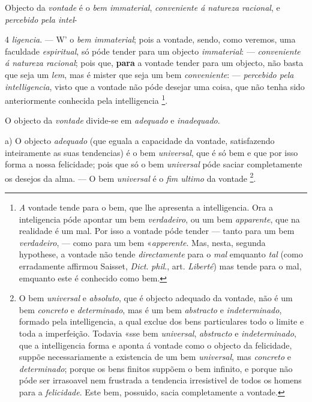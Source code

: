 
Objecto da \emph{vontade} é o \emph{bem immaterial}, \emph{conveniente á natureza racional}, e \emph{percebido pela intel}-

4 \emph{ligencia}. --- W' o \emph{bem immaterial}; pois a vontade, sendo, como veremos, uma faculdade \emph{espiritual}, só póde tender para um   objecto \emph{immaterial}: --- \emph{conveniente á natureza racional}; pois que, \textbf{para} a vontade tender para um objecto, não basta que seja um \emph{lem}, mas é mister que seja um bem \emph{conveniente}: --- \emph{percebido pela intelligencia}, visto que a vontade não póde desejar uma coisa, que não tenha sido anteriormente conhecida pela intelligencia \footnote{\emph{A} vontade tende para o bem, que lhe apresenta a intelligencia. Ora a inteligencia póde apontar um bem \emph{verdadeiro}, ou um bem \emph{apparente}, que na realidade é um mal. Por isso a vontade póde tender --- tanto para um bem \emph{verdadeiro}, --- como para um bem «\emph{apperente}. Mas, nesta, segunda hypothese, a vontade não tende \emph{directamente} para o \emph{mal} emquanto \emph{tal} (como erradamente affirmou Saisset, \emph{Dict}. \emph{phil}., art. \emph{Liberté}) mas tende para o mal, emquanto este é conhecido como bem.}.


O objecto da \emph{vontade} divide-se em \emph{adequado} e \emph{inadequado}.

a) O objecto \emph{adequado} (que eguala a capacidade da vontade, satisfazendo inteiramente as suas tendencias) é o bem \emph{universal}, que é só bem e que por isso forma a nossa felicidade; pois que só o bem \emph{universal} póde saciar completamente os desejos da alma. --- O bem \emph{universal} é o \emph{fim ultimo} da vontade \footnote{O bem \emph{universal} e \emph{absoluto}, que é objecto adequado da vontade, não é um bem \emph{concreto} e \emph{determinado}, mas é um bem \emph{abstracto} e \emph{indeterminado}, formado pela intelligencia, a qual exclue dos bens particulares todo o limite e toda a imperfeição. Todavia «sse bem \emph{universal}, \emph{abstracto} e \emph{indeterminado}, que a intelligencia forma e aponta á vontade como o objecto da felicidade, suppõe necessariamente a existencia de um bem \emph{universal}, mas \emph{concreto} e \emph{determinado}; porque os bens finitos suppõem o bem infinito, e porque não póde ser irrasoavel nem frustrada a tendencia irresistivel de todos os homens para a \emph{felicidade}. Este bem, possuido, sacia completamente a vontade.}.

